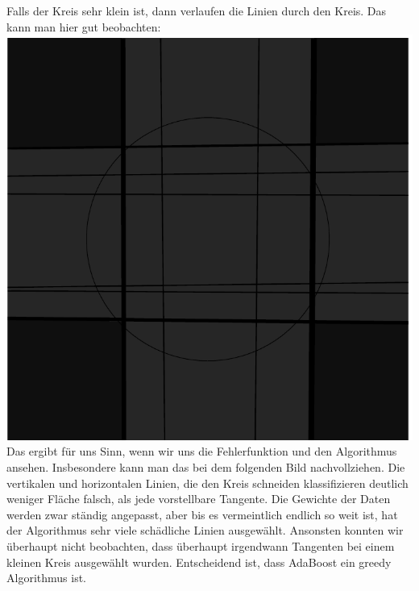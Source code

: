 \documentclass{article}
\begin{document}
\newpage
Falls der Kreis sehr klein ist, dann verlaufen die Linien durch den
Kreis. Das kann man hier gut beobachten:\\
\includegraphics[scale=0.75]{03.pdf}\\


Das ergibt für uns Sinn, wenn wir uns die Fehlerfunktion und den
Algorithmus ansehen. Insbesondere kann man das bei dem folgenden Bild
nachvollziehen. Die vertikalen und horizontalen Linien, die den Kreis
schneiden klassifizieren deutlich weniger Fläche falsch, als jede
vorstellbare Tangente. Die Gewichte der Daten werden zwar ständig
angepasst, aber bis es vermeintlich endlich so weit ist, hat der
Algorithmus sehr viele schädliche Linien ausgewählt. Ansonsten konnten
wir überhaupt nicht beobachten, dass überhaupt irgendwann Tangenten
bei einem kleinen Kreis ausgewählt wurden. Entscheidend ist, dass
AdaBoost ein greedy Algorithmus ist.\\
\end{document}
